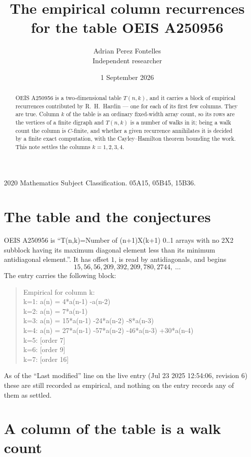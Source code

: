 \documentclass[11pt,a4paper]{article}
\title{The empirical column recurrences for the table OEIS A250956}
\author{Adrian Perez Fontelles\\ \small Independent researcher}
\date{1 September 2026}
\theoremstyle{plain}
\theoremstyle{definition}
\begin{document}
\maketitle

\begin{abstract}
OEIS A250956 is a two-dimensional table $T(n,k)$, and it carries a block of empirical
recurrences contributed by R.~H.~Hardin --- one for each of its first few columns. They are
true. Column $k$ of the table is an ordinary fixed-width array count, so its rows are the
vertices of a finite digraph and $T(n,k)$ is a number of walks in it; being a walk count the
column is $C$-finite, and whether a given recurrence annihilates it is decided by a finite
exact computation, with the Cayley--Hamilton theorem bounding the work. This note settles the columns $k=1, 2, 3, 4$.
\end{abstract}

\noindent\small 2020 Mathematics Subject Classification. 05A15, 05B45, 15B36.\normalsize

\section{The table and the conjectures}

OEIS A250956 is ``T(n,k)=Number of (n+1)X(k+1) 0..1 arrays with no 2X2 subblock having its maximum diagonal element less than its minimum antidiagonal element.''. It has offset $1$, is
read by antidiagonals, and begins
\[
15, 56, 56, 209, 392, 209, 780, 2744,\ \dots
\]
The entry carries the following block:
\begin{quote}\small
Empirical for column k:\\
k=1: a(n) = 4*a(n-1) -a(n-2)\\
k=2: a(n) = 7*a(n-1)\\
k=3: a(n) = 15*a(n-1) -24*a(n-2) -8*a(n-3)\\
k=4: a(n) = 27*a(n-1) -57*a(n-2) -46*a(n-3) +30*a(n-4)\\
k=5: [order 7]\\
k=6: [order 9]\\
k=7: [order 16]\\
\end{quote}
As of the ``Last modified'' line on the live entry (Jul 23 2025 12:54:06, revision 6) these are still
recorded as empirical, and nothing on the entry records any of them as settled.

\section{A column of the table is a walk count}
\end{document}
